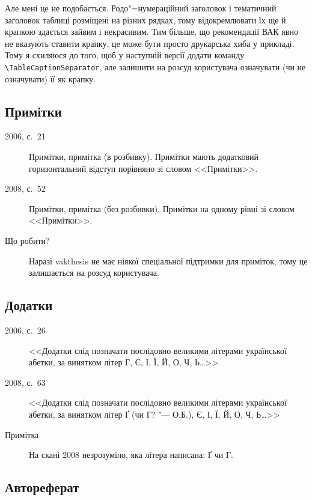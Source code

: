 \documentclass[a4paper]{article}
\newcommand{\vakthesis}{\textsf{vakthesis}}
\begin{document}
\begin{description}
Але мені це не подобається. Родо"=нумераційний заголовок і тематичний
заголовок таблиці розміщені на різних рядках, тому відокремлювати їх
ще й крапкою здається зайвим і некрасивим. Тим більше, що рекомендації
ВАК явно не вказують ставити крапку, це може бути просто друкарська
хиба у прикладі. Тому я схиляюся до того, щоб у наступній версії
додати команду \verb|\TableCaptionSeparator|, але залишити на розсуд
користувача означувати (чи не означувати) її як крапку.
\end{description}

\subsection{Примітки}

\begin{description}
\item[2006, с.~21] Примітки, примітка (в розбивку). Примітки мають
  додатковий горизонтальний відступ порівняно зі словом <<Примітки>>.

\item[2008, с.~52] Примітки, примітка (без розбивки). Примітки на
  одному рівні зі словом <<Примітки>>.

\item[Що робити?] Наразі \vakthesis{} не має ніякої спеціальної
  підтримки для приміток, тому це залишається на розсуд користувача.
\end{description}

\subsection{Додатки}

\begin{description}
\item[2006, с.~26] <<Додатки слід позначати послідовно великими
  літерами української абетки, за винятком літер Г, Є, І, Ї, Й, О, Ч,
  Ь\ldots{}>>

\item[2008, с.~63] <<Додатки слід позначати послідовно великими
  літерами української абетки, за винятком літер Ґ (чи Г? "--- О.Б.),
  Є, І, Ї, Й, О, Ч, Ь\ldots{}>>

\item[Примітка] На скані 2008 незрозуміло, яка літера написана: Ґ чи
  Г.
\end{description}

\subsection{Автореферат}
\end{document}
